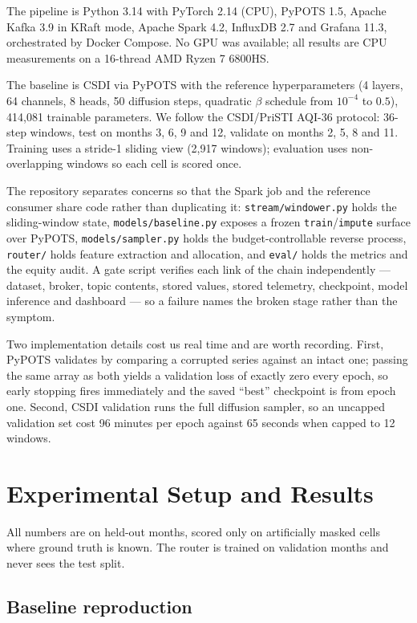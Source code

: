 \documentclass[conference]{IEEEtran}
\begin{document}
The pipeline is Python 3.14 with PyTorch 2.14 (CPU), PyPOTS 1.5, Apache Kafka
3.9 in KRaft mode, Apache Spark 4.2, InfluxDB 2.7 and Grafana 11.3, orchestrated
by Docker Compose. No GPU was available; all results are CPU measurements on a
16-thread AMD Ryzen 7 6800HS.

The baseline is CSDI via PyPOTS with the reference hyperparameters (4 layers,
64 channels, 8 heads, 50 diffusion steps, quadratic $\beta$ schedule from
$10^{-4}$ to $0.5$), 414{,}081 trainable parameters. We follow the CSDI/PriSTI
AQI-36 protocol: 36-step windows, test on months 3, 6, 9 and 12, validate on
months 2, 5, 8 and 11. Training uses a stride-1 sliding view (2{,}917 windows);
evaluation uses non-overlapping windows so each cell is scored once.

The repository separates concerns so that the Spark job and the reference
consumer share code rather than duplicating it: \texttt{stream/windower.py}
holds the sliding-window state, \texttt{models/baseline.py} exposes a frozen
\texttt{train}/\texttt{impute} surface over PyPOTS, \texttt{models/sampler.py}
holds the budget-controllable reverse process, \texttt{router/} holds feature
extraction and allocation, and \texttt{eval/} holds the metrics and the equity
audit. A gate script verifies each link of the chain independently --- dataset,
broker, topic contents, stored values, stored telemetry, checkpoint, model
inference and dashboard --- so a failure names the broken stage rather than the
symptom.

Two implementation details cost us real time and are worth recording. First,
PyPOTS validates by comparing a corrupted series against an intact one; passing
the same array as both yields a validation loss of exactly zero every epoch, so
early stopping fires immediately and the saved ``best'' checkpoint is from epoch
one. Second, CSDI validation runs the full diffusion sampler, so an uncapped
validation set cost 96 minutes per epoch against 65 seconds when capped to 12
windows.

\section{Experimental Setup and Results}
\label{sec:results}

All numbers are on held-out months, scored only on artificially masked cells
where ground truth is known. The router is trained on validation months and
never sees the test split.

\subsection{Baseline reproduction}
\end{document}
